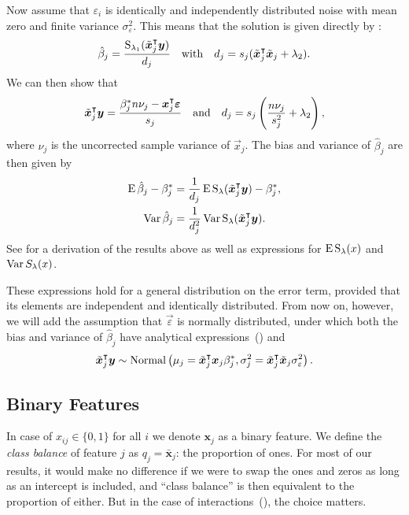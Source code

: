 Now assume that \(\varepsilon_i\) is identically and independently distributed noise with
mean zero and finite variance \(\sigma_\varepsilon^2\). This means that the solution is
given directly by :
\[
  \hat{\beta}_j = \frac{\operatorname{S}_{\lambda_1}(\tilde{\boldsymbol{x}}_j^\intercal \boldsymbol{y})}{d_j}\quad\text{with}\quad d_j = s_j(\tilde{\boldsymbol{x}}_j^\intercal \tilde{\boldsymbol{x}}_j + \lambda_2).
\]
We can then show that
\begin{equation}
  \label{eq:z-d}
  \tilde{\boldsymbol{x}}_j^\intercal \boldsymbol{y} = \frac{\beta_j^* n \nu_j- \boldsymbol{x}_j^\intercal \boldsymbol{\varepsilon}}{s_j}
  \quad\text{and}\quad
  d_j = s_j\left(\frac{n \nu_j}{s_j^2} + \lambda_2\right),
\end{equation}
where \(\nu_j\) is the uncorrected sample variance of \(\vec{x}_j\).
The bias and variance of \(\hat{\beta}_j\) are then given by
\begin{align}
  \operatorname{E} \hat\beta_j - \beta_j^* & = \frac{1}{d_j}\operatorname{E} \operatorname{S}_\lambda(\tilde{\boldsymbol{x}}_j^\intercal \boldsymbol{y}) - \beta^*_j,\label{eq:bias} \\
  \operatorname{Var} \hat\beta_j           & = \frac{1}{d_j^2} \operatorname{Var} \operatorname{S}_\lambda(\tilde{\boldsymbol{x}}_j^\intercal \boldsymbol{y}).\label{eq:variance}
\end{align}
See  for a derivation of the results above
as well as expressions for \(\operatorname{E} \operatorname{S}_\lambda(x)\) and \(\operatorname{Var} S_\lambda(x)\).

These expressions hold for a general distribution on the error term, provided that its
elements are independent and identically distributed. From now on, however, we will add the
assumption that \(\vec{\varepsilon}\) is normally distributed, under which both the bias
and variance of \(\hat{\beta}_j\) have analytical
expressions~() and
\[
  \tilde{\boldsymbol{x}}_j^\intercal \boldsymbol{y} \sim \operatorname{Normal}\left(\mu_j = \tilde{\boldsymbol{x}}_j^\intercal\boldsymbol{x}_j \beta_j^*, \sigma_j^2 = \tilde{\boldsymbol{x}}_j^\intercal\tilde{\boldsymbol{x}}_j \sigma_\varepsilon^2 \right).
\]

\subsection{Binary Features}%
\label{sec:theory-binary-features}
In case of \(x_{ij} \in \{0, 1\}\) for all \(i\) we denote \(\bm{x}_j\) as a binary feature.
We define the \emph{class balance} of feature $j$ as \(q_j = \bar{\bm{x}}_j\): the proportion of ones. For most of our results, it would make
no difference if we were to swap the ones and zeros as long as an intercept is included,
and ``class balance'' is then equivalent to the proportion of either. But in the case of
interactions~(), the choice matters.

